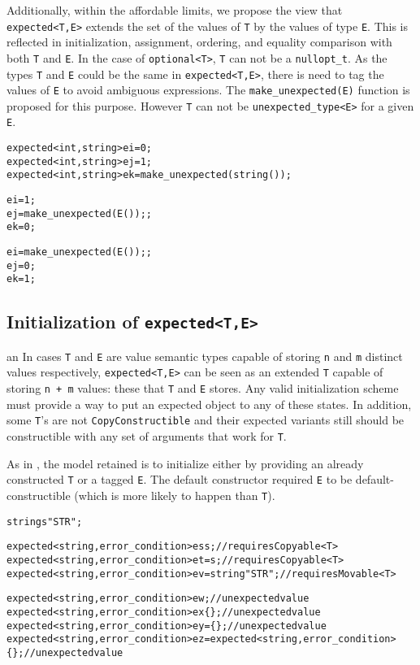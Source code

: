 \documentclass[a4paper,10pt]{article}
\newcommand{\cpp}[1]{\lstinline{#1}}
\begin{document}
Additionally, within the affordable limits, we propose the view that \cpp{expected<T,E>} extends the set of the values of \cpp{T} by the values of type \cpp{E}. This is reflected in initialization, assignment, ordering, and equality comparison with both \cpp{T} and \cpp{E}. In the case of  \cpp{optional<T>}, \cpp{T} can not be a \cpp{nullopt_t}. As the types \cpp{T} and \cpp{E} could be the same in \cpp{expected<T,E>}, there is need to tag the values of \cpp{E} to avoid ambiguous expressions. The \cpp{make_unexpected(E)} function is proposed for this purpose. However \cpp{T} can not be  \cpp{unexpected_type<E>} for a given \cpp{E}.

\begin{alltt}
expected<int, string> ei = 0;
expected<int, string> ej = 1;
expected<int, string> ek = make_unexpected(string());

ei = 1;
ej = make_unexpected(E());;
ek = 0;

ei = make_unexpected(E());;
ej = 0;
ek = 1;
\end{alltt}

\subsection{Initialization of \cpp{expected<T,E>}}
an
In cases \cpp{T} and \cpp{E} are value semantic types capable of storing \cpp{n} and \cpp{m} distinct values respectively, \cpp{expected<T,E>} can be seen as an extended \cpp{T} capable of storing \cpp{n + m} values: these that \cpp{T} and \cpp{E} stores. Any valid initialization scheme must provide a way to put an expected object to any of these states. In addition, some \cpp{T}'s  are not \cpp{CopyConstructible} and their expected variants still should be constructible with any set of arguments that work for \cpp{T}.

\noindent
As in \cite{OptionalRev4}, the model retained is to initialize either by providing an already constructed \cpp{T} or a tagged \cpp{E}. The default constructor required \cpp{E} to be default-constructible (which is more likely to happen than \cpp{T}).

\begin{alltt}
string s{"STR"};

expected<string, error_condition> es{s};              // requires Copyable<T>
expected<string, error_condition> et = s;             // requires Copyable<T>
expected<string, error_condition> ev = string{"STR"}; // requires Movable<T>

expected<string, error_condition> ew;                 // unexpected value
expected<string, error_condition> ex\{\};               // unexpected value
expected<string, error_condition> ey = \{\};            // unexpected value
expected<string,error_condition> ez = expected<string,error_condition>\{\};  // unexpected value
\end{alltt}
\end{document}
